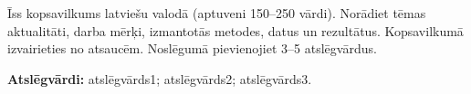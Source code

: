 Īss kopsavilkums latviešu valodā (aptuveni 150–250 vārdi). Norādiet tēmas aktualitāti, darba mērķi, izmantotās metodes, datus un rezultātus. Kopsavilkumā izvairieties no atsaucēm. Noslēgumā pievienojiet 3–5 atslēgvārdus.

\noindent\textbf{Atslēgvārdi:} atslēgvārds1; atslēgvārds2; atslēgvārds3.
